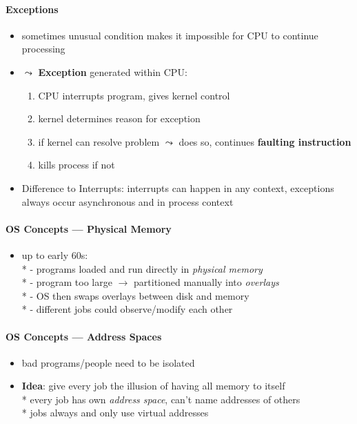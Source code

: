 \paragraph{Exceptions}
\begin{itemize}
	\item sometimes unusual condition makes it impossible for CPU to continue processing
	\item \( \leadsto \) \textbf{Exception} generated within CPU:
	\begin{enumerate}
		\item CPU interrupts program, gives kernel control
		\item kernel determines reason for exception
		\item if kernel can resolve problem \( \leadsto \) does so, continues \textbf{faulting instruction}
		\item kills process if not
	\end{enumerate}
	\item Difference to Interrupts: interrupts can happen in any context, exceptions always occur asynchronous and in process context
\end{itemize}

\paragraph{OS Concepts --- Physical Memory}
\begin{itemize}
	\item up to early 60s: \\* 
		- programs loaded and run directly in \emph{physical memory}
		\\*
		- program too large \( \to \) partitioned manually into \emph{overlays}
		\\*
		- OS then swaps overlays between disk and memory
		\\*
		- different jobs could observe/modify each other
\end{itemize}

\paragraph{OS Concepts --- Address Spaces}
\begin{itemize}
	\item bad programs/people need to be isolated
	\item \textbf{Idea}: give every job the illusion of having all memory to itself
		\\*
		every job has own \emph{address space}, can't name addresses of others
		\\*
		jobs always and only use virtual addresses
\end{itemize}

